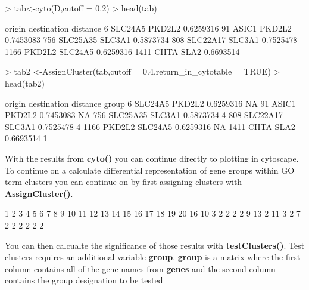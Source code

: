 \documentclass{article}
\begin{document}
\begin{Schunk}
\begin{Sinput}
> tab<-cyto(D,cutoff = 0.2)
> head(tab)
\end{Sinput}
\begin{Soutput}
       origin destination  distance
6     SLC24A5      PKD2L2 0.6259316
91      ASIC1      PKD2L2 0.7453083
756  SLC25A35      SLC3A1 0.5873734
808  SLC22A17      SLC3A1 0.7525478
1166   PKD2L2     SLC24A5 0.6259316
1411    CIITA        SLA2 0.6693514
\end{Soutput}
\begin{Sinput}
> tab2 <-AssignCluster(tab,cutoff = 0.4,return_in_cytotable = TRUE)
> head(tab2)
\end{Sinput}
\begin{Soutput}
       origin destination  distance group
6     SLC24A5      PKD2L2 0.6259316    NA
91      ASIC1      PKD2L2 0.7453083    NA
756  SLC25A35      SLC3A1 0.5873734     4
808  SLC22A17      SLC3A1 0.7525478     4
1166   PKD2L2     SLC24A5 0.6259316    NA
1411    CIITA        SLA2 0.6693514     1
\end{Soutput}
\end{Schunk}

With the results from \textbf{cyto()} you can continue directly to plotting in cytoscape. To continue on a calculate differential representation of gene groups within GO term clusters you can continue on by first assigning clusters with \textbf{AssignCluster()}.

\begin{Schunk}
\begin{Soutput}
 1  2  3  4  5  6  7  8  9 10 11 12 13 14 15 16 17 18 19 20 
16 10  3  2  2  2  2  9 13  2 11  3  2  7  2  2  2  2  2  2 
\end{Soutput}
\end{Schunk}

You can then calcualte the significance of those results with \textbf{testClusters()}. Test clusters requires an additional variable \textbf{group}. \textbf{group} is a matrix where the first column contains all of the gene names from \textbf{genes} and the second column contains the group designation to be tested
\end{document}
